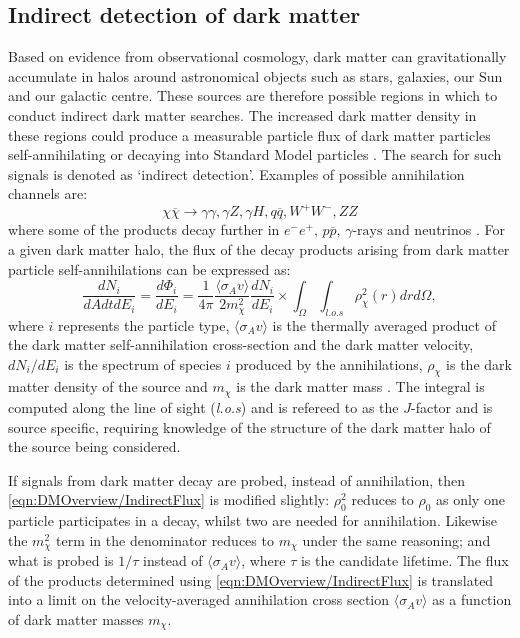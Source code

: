 \subsection{Indirect detection of dark matter}\label{sec:DMOverview/IndirectDM}
Based on evidence from observational cosmology, dark matter can gravitationally accumulate in halos around astronomical objects such as stars, galaxies, our Sun and our galactic centre. These sources are therefore possible regions in which to conduct indirect dark matter searches. The increased dark matter density in these regions could produce a measurable particle flux of dark matter particles self-annihilating or decaying into Standard Model particles \cite{Strigari:2012acq}. The search for such signals is denoted as `indirect detection'. Examples of possible annihilation channels are:
\begin{equation}
    \chi\overline{\chi}\rightarrow\gamma\gamma,\gamma Z,\gamma H,q\overline{q},W^+W^-,ZZ
\end{equation}
where some of the products decay further in $e^-e^+,\,p\overline{p},\,\gamma\text{-rays}$ and neutrinos \cite{DirectDetection2015}. For a given dark matter halo, the flux of the decay products arising from dark matter particle self-annihilations can be expressed as:
\begin{equation}\label{eqn:DMOverview/IndirectFlux}
    \frac{dN_i}{dAdtdE_i}=\frac{d\Phi_i}{dE_i}=\frac{1}{4\pi}\frac{\langle\sigma_Av\rangle}{2m^2_\chi}\frac{dN_i}{dE_i}\times\int_\Omega\int_{l.o.s}\rho^2_\chi(r)drd\Omega,
\end{equation}
where $i$ represents the particle type, $\langle\sigma_Av\rangle$ is the thermally averaged product of the dark matter self-annihilation cross-section and the dark matter velocity, $dN_i/dE_i$ is the spectrum of species $i$ produced by the annihilations, $\rho_\chi$ is the dark matter density of the source and $m_\chi$ is the dark matter mass \cite{PerezdelosHeros:2020qyt}. The integral is computed along the line of sight (\textit{l.o.s}) and is refereed to as the $J$-factor and is source specific, requiring knowledge of the structure of the dark matter halo of the source being considered.

If signals from dark matter decay are probed, instead of annihilation, then \autoref{eqn:DMOverview/IndirectFlux} is modified slightly: $\rho_0^2$ reduces to $\rho_0$ as only one particle participates in a decay, whilst two are needed for annihilation. Likewise the $m_\chi^2$ term in the denominator reduces to $m_\chi$ under the same reasoning; and what is probed is $1/\tau$ instead of $\langle\sigma_Av\rangle$, where $\tau$ is the candidate lifetime.
The flux of the products determined using \autoref{eqn:DMOverview/IndirectFlux} is translated into a limit on the velocity-averaged annihilation cross section $\langle\sigma_Av\rangle$ as a function of dark matter masses $m_\chi$. 

